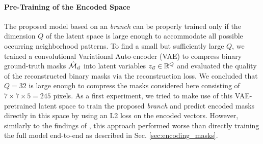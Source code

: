 \paragraph{Pre-Training of the Encoded Space} The proposed model based on an \emph{\encBr branch} can be properly trained only if the dimension $Q$ of the latent space is large enough to accommodate all possible occurring neighborhood patterns. 
To find a small but sufficiently large $Q$, we trained a convolutional Variational Auto-encoder (VAE) \cite{kingma2013auto,rezende2014stochastic} to compress binary ground-truth \maskname masks $\hat{\mathcal{M}}_{\vec{u}}$ into latent variables $z_{\vec{u}}\in \mathbb{R}^Q$ and evaluated the quality of the reconstructed binary masks via the reconstruction loss. We concluded that $Q=32$ is large enough to compress the masks considered here consisting of $7\times 7 \times 5=245$ pixels. 
As a first experiment, we tried to make use of this VAE-pretrained latent space to train the proposed \emph{\encBr branch} and predict encoded masks directly in this space by using an L2 loss on the encoded vectors. However, similarly to the findings of \cite{hirsch2020patchperpix}, this approach performed worse than directly training the full model end-to-end as described in Sec. \ref{sec:encoding_masks}. 
